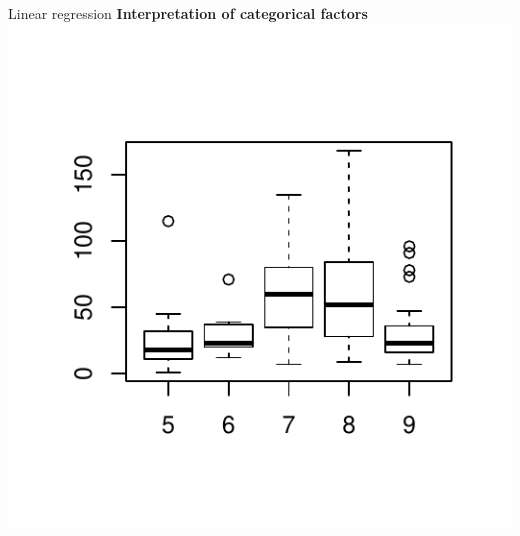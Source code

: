 \documentclass[10pt,xcolor=dvipsnames]{beamer}\usepackage[]{graphicx}\usepackage[]{color}
\makeatletter
\def\maxwidth{ %
  \ifdim\Gin@nat@width>\linewidth
    \linewidth
  \else
    \Gin@nat@width
  \fi
}
\newenvironment{knitrout}{}{} %
\makeatother
\begin{document}
\begin{frame}[fragile]{Linear regression}
\textbf{Interpretation of categorical factors}
\begin{knitrout}
\color{fgcolor}
\includegraphics[width=\maxwidth]{figure/lmModF-1} 

\end{knitrout}
\end{frame}
\end{document}
